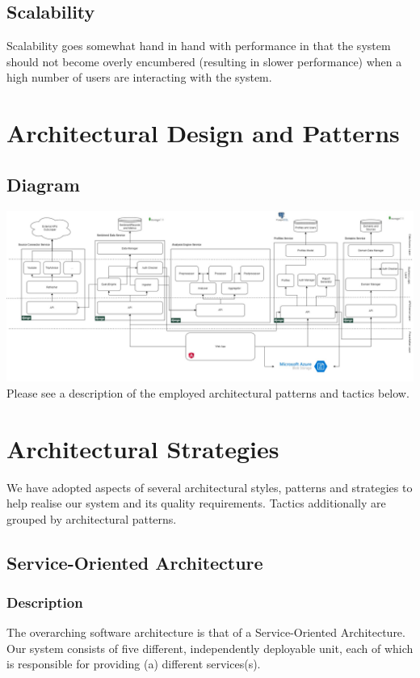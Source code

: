\documentclass[12pt]{article}
\begin{document}
\subsection{Scalability}
Scalability goes somewhat hand in hand with performance in that the system should not become overly encumbered (resulting in slower performance) when a high number of users are interacting with the system.


\newpage
\section{Architectural Design and Patterns}
\subsection{Diagram}
\includegraphics[width=1\textwidth]{Demo4Architecture.jpg}
Please see a description of the employed architectural patterns and tactics below.


\newpage
\section{Architectural Strategies}
We have adopted aspects of several architectural styles, patterns and strategies to help realise our system and its quality requirements. Tactics additionally are grouped by architectural patterns.
\subsection{Service-Oriented Architecture}
\subsubsection{Description}
The overarching software architecture is that of a Service-Oriented Architecture. Our system consists of five different, independently deployable unit, each of which is responsible for providing (a) different services(s).
\end{document}
